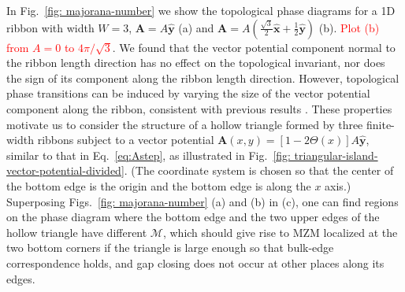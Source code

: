 \documentclass[aps,prb,showpacs,amsmath,twocolumn,amssymb,superscriptaddress]{revtex4-2}
\newcommand{\Red}[1]{\textcolor{red}{#1}}
\let\oldhat\hat
\renewcommand{\hat}[1]{\oldhat{\mathbf{#1}}}
\begin{document}
In Fig.~\ref{fig: majorana-number} we show the topological phase diagrams for a 1D ribbon with width $W=3$, $\bm A = A\hat{y}$ (a) and $\bm A = A(\frac{\sqrt{3}}{2}\hat{x}+\frac{1}{2}\hat{y})$ (b). \Red{Plot (b) from $A=0$ to $4\pi/\sqrt{3}$}. We found that the vector potential component normal to the ribbon length direction has no effect on the topological invariant, nor does the sign of its component along the ribbon length direction. However, topological phase transitions can be induced by varying the size of the vector potential component along the ribbon, consistent with previous results \cite{romitoManipulatingMajoranaFermions2012, takasanSupercurrentinducedTopologicalPhase2022}. These properties motivate us to consider the structure of a hollow triangle formed by three finite-width ribbons subject to a vector potential $\mathbf A(x,y) = \left[1-2\Theta(x)\right]A\hat{y}$, similar to that in Eq.~\eqref{eq:Astep}, as illustrated in Fig.~\ref{fig: triangular-island-vector-potential-divided}. (The coordinate system is chosen so that the center of the bottom edge is the origin and the bottom edge is along the $x$ axis.) Superposing Figs.~\ref{fig: majorana-number} (a) and (b) in (c), one can find regions on the phase diagram where the bottom edge and the two upper edges of the hollow triangle have different $\mathcal{M}$, which should give rise to MZM localized at the two bottom corners if the triangle is large enough so that bulk-edge correspondence holds, and gap closing does not occur at other places along its edges. 
\end{document}
